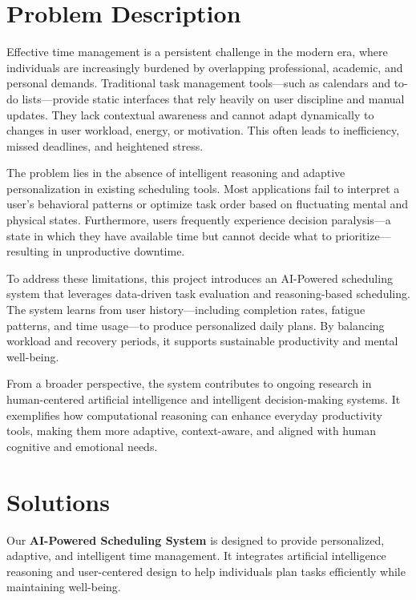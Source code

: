 \documentclass[12pt, a4paper]{article}
\begin{document}
\section{Problem Description}

    Effective time management is a persistent challenge in the modern era, where individuals are increasingly burdened by overlapping professional, academic, and personal demands. Traditional task management tools—such as calendars and to-do lists—provide static interfaces that rely heavily on user discipline and manual updates. They lack contextual awareness and cannot adapt dynamically to changes in user workload, energy, or motivation. This often leads to inefficiency, missed deadlines, and heightened stress.
    
    The problem lies in the absence of intelligent reasoning and adaptive personalization in existing scheduling tools. Most applications fail to interpret a user’s behavioral patterns or optimize task order based on fluctuating mental and physical states. Furthermore, users frequently experience decision paralysis—a state in which they have available time but cannot decide what to prioritize—resulting in unproductive downtime.
    
    To address these limitations, this project introduces an AI-Powered scheduling system that leverages data-driven task evaluation and reasoning-based scheduling. The system learns from user history—including completion rates, fatigue patterns, and time usage—to produce personalized daily plans. By balancing workload and recovery periods, it supports sustainable productivity and mental well-being.
    
    From a broader perspective, the system contributes to ongoing research in human-centered artificial intelligence and intelligent decision-making systems. It exemplifies how computational reasoning can enhance everyday productivity tools, making them more adaptive, context-aware, and aligned with human cognitive and emotional needs.



\section{Solutions}

    Our \textbf{AI-Powered Scheduling System} is designed to provide personalized, adaptive, and intelligent time management. It integrates artificial intelligence reasoning and user-centered design to help individuals plan tasks efficiently while maintaining well-being.
    
\end{document}
